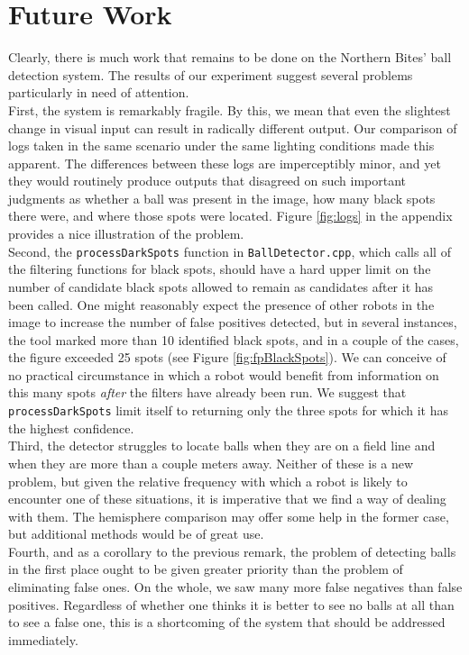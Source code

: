\documentclass[11pt, twocolumn]{article}
\begin{document}
{\section{Future Work}
Clearly, there is much work that remains to be done on the Northern Bites' ball detection system. The results of our experiment suggest several problems particularly in need of attention. \\
\indent First, the system is remarkably fragile. By this, we mean that even the slightest change in visual input can result in radically different output. Our comparison of logs taken in the same scenario under the same lighting conditions made this apparent. The differences between these logs are imperceptibly minor, and yet they would routinely produce outputs that disagreed on such important judgments as whether a ball was present in the image, how many black spots there were, and where those spots were located. Figure \ref{fig:logs} in the appendix provides a nice illustration of the problem. \\
\indent Second, the \texttt{processDarkSpots} function in \texttt{BallDetector.cpp}, which calls all of the filtering functions for black spots, should have a hard upper limit on the number of candidate black spots allowed to remain as candidates after it has been called. One might reasonably expect the presence of other robots in the image to increase the number of false positives detected, but in several instances, the tool marked more than 10 identified black spots, and in a couple of the cases, the figure exceeded 25 spots (see Figure \ref{fig:fpBlackSpots}). We can conceive of no practical circumstance in which a robot would benefit from information on this many spots \emph{after} the filters have already been run. We suggest that \texttt{processDarkSpots} limit itself to returning only the three spots for which it has the highest confidence. \\
\indent Third, the detector struggles to locate balls when they are on a field line and when they are more than a couple meters away. Neither of these is a new problem, but given the relative frequency with which a robot is likely to encounter one of these situations, it is imperative that we find a way of dealing with them. The hemisphere comparison may offer some help in the former case, but additional methods would be of great use. \\
\indent Fourth, and as a corollary to the previous remark, the problem of detecting balls in the first place ought to be given greater priority than the problem of eliminating false ones. On the whole, we saw many more false negatives than false positives. Regardless of whether one thinks it is better to see no balls at all than to see a false one, this is a shortcoming of the system that should be addressed immediately. \\
}
\end{document}
